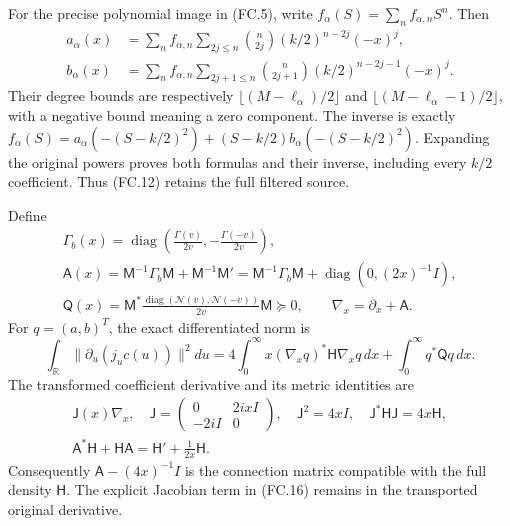 For the precise polynomial image in (FC.5), write
\(f_\alpha(S)=\sum_n f_{\alpha,n}S^n\). Then
\[
 \begin{aligned}
 a_\alpha(x)&=\sum_n f_{\alpha,n}\sum_{2j\le n}
           \binom n{2j}(k/2)^{n-2j}(-x)^j,\\
 b_\alpha(x)&=\sum_n f_{\alpha,n}\sum_{2j+1\le n}
           \binom n{2j+1}(k/2)^{n-2j-1}(-x)^j.
 \end{aligned}
 \tag{FC.13}
\]
Their degree bounds are respectively
\(\lfloor(M-\ell_\alpha)/2\rfloor\) and
\(\lfloor(M-\ell_\alpha-1)/2\rfloor\), with a negative bound
meaning a zero component. The inverse is exactly
\(f_\alpha(S)=a_\alpha(-(S-k/2)^2)
 +(S-k/2)b_\alpha(-(S-k/2)^2)\). Expanding the original powers
proves both formulas and their inverse, including every \(k/2\)
coefficient. Thus (FC.12) retains the full filtered source.

\begin{theorem}
Define
\[
 \begin{gathered}
 \Gamma_b(x)=\operatorname{diag}
       \left(\frac{\Gamma(v)}{2v},-\frac{\Gamma(-v)}{2v}\right),\\
 \mathsf A(x)=\mathsf M^{-1}\Gamma_b\mathsf M
                 +\mathsf M^{-1}\mathsf M'
       =\mathsf M^{-1}\Gamma_b\mathsf M
                 +\operatorname{diag}(0,(2x)^{-1}I),\\
 \mathsf Q(x)=\mathsf M^*
       \frac{\operatorname{diag}(\mathcal N(v),\mathcal N(-v))}{2v}
                                    \mathsf M\succeq0,
 \qquad \nabla_x=\partial_x+\mathsf A.
 \end{gathered}
 \tag{FC.14}
\]
For \(q=(a,b)^T\), the exact differentiated norm is
\[
 \boxed{\int_{\mathbb R}\|\partial_u(j_uc(u))\|^2du
       =4\int_0^\infty x(\nabla_xq)^*\mathsf H\nabla_xq\,dx
                 +\int_0^\infty q^*\mathsf Qq\,dx.}
 \tag{FC.15}
\]
The transformed coefficient derivative and its metric identities are
\[
 \begin{gathered}
 \mathsf J(x)\nabla_x,
 \quad \mathsf J=\begin{pmatrix}0&2ixI\\-2iI&0\end{pmatrix},
 \quad \mathsf J^2=4xI,
 \quad \mathsf J^*\mathsf H\mathsf J=4x\mathsf H,\\
 \mathsf A^*\mathsf H+\mathsf H\mathsf A
          =\mathsf H'+\frac1{2x}\mathsf H.
 \end{gathered}
 \tag{FC.16}
\]
Consequently \(\mathsf A-(4x)^{-1}I\) is the connection matrix
compatible with the full density \(\mathsf H\). The explicit
Jacobian term in (FC.16) remains in the transported original derivative.
\end{theorem}

